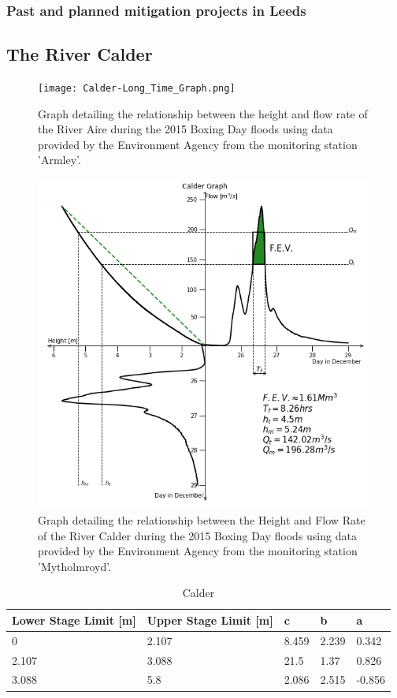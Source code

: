\documentclass[11pt,a4paper]{article}
\begin{document}
\subsubsection{Past and planned mitigation projects in Leeds}

\subsection{The River Calder}
\begin{figure}[H]
\begin{center}
\texttt{[image: Calder-Long\_Time\_Graph.png]}
\caption{Graph detailing the relationship between the height and flow rate of the River Aire during the 2015 Boxing Day floods using data provided by the Environment Agency from the monitoring station 'Armley'.}
\end{center}
\end{figure}
\begin{figure}[H]
\begin{center}
\includegraphics[scale=0.45]{Calder-Quadrant_Graph.png}
\caption{Graph detailing the relationship between the Height and Flow Rate of the River Calder during the 2015 Boxing Day floods using data provided by the Environment Agency from the monitoring station 'Mytholmroyd'.}
\end{center}
\end{figure}
\begin{table}[H]
\centering
\begin{tabular}{|l|l|l|l|l|}
\hline
Lower Stage Limit {[}m{]} & Upper Stage Limit {[}m{]} & c & b & a \\
\hline
0 & 2.107 & 8.459 & 2.239 & 0.342 \\
2.107 & 3.088 & 21.5 & 1.37 & 0.826 \\
3.088 & 5.8 & 2.086 & 2.515 & -0.856 \\
\hline
\end{tabular}
\caption{Calder}
\end{table}
\end{document}
